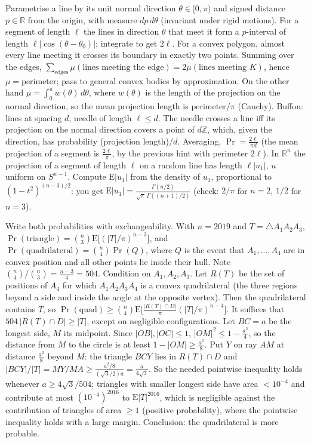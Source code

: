 \documentclass[11pt,a4paper]{article}
\begin{document}

 Parametrise a line by its unit normal direction $\theta\in[0,\pi)$ and signed distance $p\in\mathbb R$ from the origin, with measure $dp\,d\theta$ (invariant under rigid motions). For a segment of length $\ell$ the lines in direction $\theta$ that meet it form a $p$-interval of length $\ell|\cos(\theta-\theta_0)|$; integrate to get $2\ell$.
 For a convex polygon, almost every line meeting it crosses its boundary in exactly two points. Summing over the edges, $\sum_{\text{edges}}\mu(\text{lines meeting the edge})=2\mu(\text{lines meeting }K)$, hence $\mu=\text{perimeter}$; pass to general convex bodies by approximation. On the other hand $\mu=\int_0^\pi w(\theta)\,d\theta$, where $w(\theta)$ is the length of the projection on the normal direction, so the mean projection length is $\text{perimeter}/\pi$ (Cauchy).
 Buffon: lines at spacing $d$, needle of length $\ell\le d$. The needle crosses a line iff its projection on the normal direction covers a point of $d\mathbb Z$, which, given the direction, has probability (projection length)$/d$. Averaging, $\Pr=\frac{2\ell}{\pi d}$ (the mean projection of a segment is $\frac{2\ell}{\pi}$, by the previous hint with perimeter $2\ell$).
 In $\mathbb R^n$ the projection of a segment of length $\ell$ on a random line has length $\ell|u_1|$, $u$ uniform on $S^{n-1}$. Compute $\mathrm E|u_1|$ from the density of $u_1$, proportional to $(1-t^2)^{(n-3)/2}$: you get $\mathrm E|u_1|=\frac{\Gamma(n/2)}{\sqrt\pi\,\Gamma((n+1)/2)}$ (check: $2/\pi$ for $n=2$, $1/2$ for $n=3$).

 Write both probabilities with exchangeability. With $n=2019$ and $T=\triangle A_1A_2A_3$, $\Pr(\text{triangle})=\binom n3\mathrm E\big[(|T|/\pi)^{n-3}\big]$, and $\Pr(\text{quadrilateral})=\binom n4\Pr(Q)$, where $Q$ is the event that $A_1,\dots,A_4$ are in convex position and all other points lie inside their hull. Note $\binom n4/\binom n3=\frac{n-3}4=504$.
 Condition on $A_1,A_2,A_3$. Let $R(T)$ be the set of positions of $A_4$ for which $A_1A_2A_3A_4$ is a convex quadrilateral (the three regions beyond a side and inside the angle at the opposite vertex). Then the quadrilateral contains $T$, so $\Pr(\text{quad})\ge\binom n4\mathrm E\big[\frac{|R(T)\cap D|}{\pi}(|T|/\pi)^{n-4}\big]$. It suffices that $504\,|R(T)\cap D|\ge|T|$, except on negligible configurations.
 Let $BC=a$ be the longest side, $M$ its midpoint. Since $|OB|,|OC|\le1$, $|OM|^2\le1-\frac{a^2}4$, so the distance from $M$ to the circle is at least $1-|OM|\ge\frac{a^2}8$. Put $Y$ on ray $AM$ at distance $\frac{a^2}8$ beyond $M$: the triangle $BCY$ lies in $R(T)\cap D$ and $|BCY|/|T|=MY/MA\ge\frac{a^2/8}{(\sqrt3/2)a}=\frac{a}{4\sqrt3}$.
 So the needed pointwise inequality holds whenever $a\ge4\sqrt3/504$; triangles with smaller longest side have area $<10^{-4}$ and contribute at most $(10^{-4})^{2016}$ to $\mathrm E|T|^{2016}$, which is negligible against the contribution of triangles of area $\ge1$ (positive probability), where the pointwise inequality holds with a large margin. Conclusion: the quadrilateral is more probable.
\end{document}
